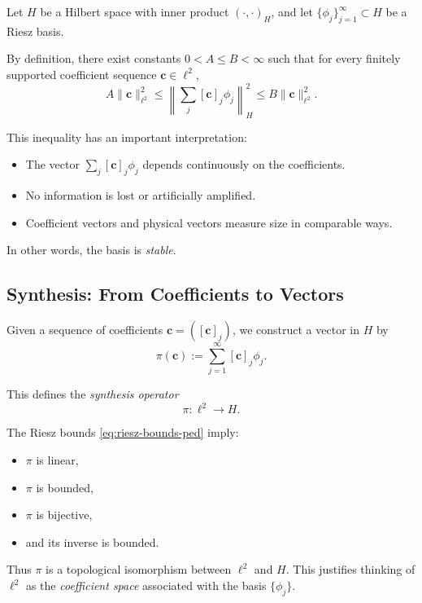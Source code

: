\documentclass[11pt,twoside,openright]{book}
\theoremstyle{plain}
\theoremstyle{definition}
\theoremstyle{remark}
\begin{document}
Let $H$ be a Hilbert space with inner product $(\cdot,\cdot)_H$,
and let $\{\phi_j\}_{j=1}^\infty \subset H$ be a Riesz basis.

By definition, there exist constants $0 < A \le B < \infty$ such that
for every finitely supported coefficient sequence $\mathbf{c} \in \ell^2$,
\begin{equation}
A \|\mathbf{c}\|_{\ell^2}^2
\le
\left\|\sum_{j} [\mathbf{c}]_j \phi_j\right\|_H^2
\le
B \|\mathbf{c}\|_{\ell^2}^2 .
\label{eq:riesz-bounds-ped}
\end{equation}

This inequality has an important interpretation:

\begin{itemize}
\item The vector $\sum_j [\mathbf{c}]_j \phi_j$ depends continuously on the coefficients.
\item No information is lost or artificially amplified.
\item Coefficient vectors and physical vectors measure size in comparable ways.
\end{itemize}

In other words, the basis is \emph{stable}.

\subsection{Synthesis: From Coefficients to Vectors}

Given a sequence of coefficients $\mathbf{c} = ([\mathbf{c}]_j)$, we construct a vector in $H$ by
\begin{equation}
\pi(\mathbf{c}) := \sum_{j=1}^\infty [\mathbf{c}]_j \phi_j .
\end{equation}

This defines the \emph{synthesis operator}
\[
\pi : \ell^2 \to H.
\]

The Riesz bounds \eqref{eq:riesz-bounds-ped} imply:

\begin{itemize}
\item $\pi$ is linear,
\item $\pi$ is bounded,
\item $\pi$ is bijective,
\item and its inverse is bounded.
\end{itemize}

Thus $\pi$ is a topological isomorphism between $\ell^2$ and $H$.
This justifies thinking of $\ell^2$ as the \emph{coefficient space}
associated with the basis $\{\phi_j\}$.
\end{document}
